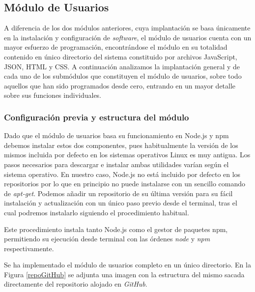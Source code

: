 \subsection{Módulo de Usuarios}
A diferencia de los dos módulos anteriores, cuya implantación se basa únicamente en la instalación y configuración de \emph{software}, el módulo de usuarios cuenta con un mayor esfuerzo de programación, encontrándose el módulo en su totalidad contenido en único directorio del sistema constituido por archivos JavaScript, JSON, HTML y CSS. A continuación analizamos la implantación general y de cada uno de los submódulos que constituyen el módulo de usuarios, sobre todo aquellos que han sido programados desde cero, entrando en un mayor detalle sobre sus funciones individuales.

\subsubsection{Configuración previa y estructura del módulo} \label{userModuleConfig}
Dado que el módulo de usuarios basa su funcionamiento en Node.js y npm debemos instalar estos dos componentes, pues habitualmente la versión de los mismos incluida por defecto en los sistemas operativos Linux es muy antigua. Los pasos necesarios para descargar e instalar ambas utilidades varían según el sistema operativo. En nuestro caso, Node.js no está incluido por defecto en los repositorios por lo que en principio no puede instalarse con un sencillo comando de \emph{apt-get}. Podemos añadir un repositorio de su última versión para su fácil instalación y actualización con un único paso previo desde el terminal, tras el cual podremos instalarlo siguiendo el procedimiento habitual.


Este procedimiento instala tanto Node.js como el gestor de paquetes npm, permitiendo su ejecución desde terminal con las órdenes \emph{node} y \emph{npm} respectivamente.

Se ha implementado el módulo de usuarios completo en un único directorio. En la Figura \ref{repoGitHub} se adjunta una imagen con la estructura del mismo sacada directamente del repositorio alojado en \emph{GitHub}.

